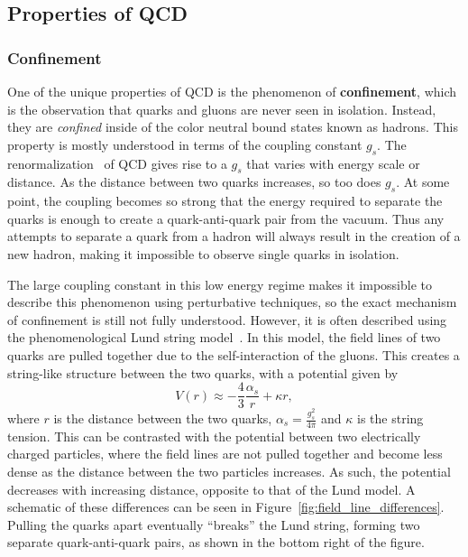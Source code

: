 \subsection{Properties of QCD}
\label{sec:qcd_properties}

\subsubsection{Confinement}
\label{sec:qcd_confinement}

One of the unique properties of QCD is the phenomenon of \textbf{confinement}, which is the observation that quarks and gluons are never seen in isolation. Instead, they are \textit{confined} inside of the color neutral bound states known as hadrons. This property is mostly understood in terms of the coupling constant $g_{s}$. The renormalization~\cite{QCDRenorm} of QCD gives rise to a $g_{s}$ that varies with energy scale or distance. As the distance between two quarks increases, so too does $g_{s}$. At some point, the coupling becomes so strong that the energy required to separate the quarks is enough to create a quark-anti-quark pair from the vacuum. Thus any attempts to separate a quark from a hadron will always result in the creation of a new hadron, making it impossible to observe single quarks in isolation. 

The large coupling constant in this low energy regime makes it impossible to describe this phenomenon using perturbative techniques, so the exact mechanism of confinement is still not fully understood. However, it is often described using the phenomenological Lund string model~\cite{LundString}. In this model, the field lines of two quarks are pulled together due to the self-interaction of the gluons. This creates a string-like structure between the two quarks, with a potential given by 
%
\begin{equation}
    \label{eq:lund_potential}
    V(r) \approx -\frac{4}{3}\frac{\alpha_s}{r} + \kappa r,
\end{equation}
%
where $r$ is the distance between the two quarks, $\alpha_s = \frac{g_s^2}{4\pi}$ and $\kappa$ is the string tension. This can be contrasted with the potential between two electrically charged particles, where the field lines are not pulled together and become less dense as the distance between the two particles increases. As such, the potential decreases with increasing distance, opposite to that of the Lund model. A schematic of these differences can be seen in Figure~\ref{fig:field_line_differences}. Pulling the quarks apart eventually ``breaks'' the Lund string, forming two separate quark-anti-quark pairs, as shown in the bottom right of the figure.

